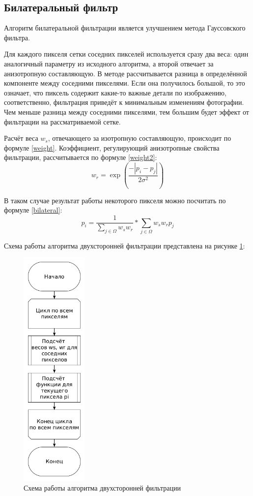 \subsection{Билатеральный фильтр}
Алгоритм билатеральной фильтрации является улучшением метода Гауссовского фильтра.

Для каждого пикселя сетки соседних пикселей используется сразу два веса: один аналогичный параметру из исходного алгоритма, а второй отвечает за анизотропную составляющую. 
В методе рассчитывается разница в определённой компоненте между соседними пикселями.
Если она получилось большой, то это означает, что пиксель содержит какие-то важные детали по изображению, соответственно, фильтрация приведёт к минимальным изменениям фотографии.
Чем меньше разница между соседними пикселями, тем большим будет эффект от фильтрации на рассматриваемой сетке.

Расчёт веса $w_s$, отвечающего за изотропную составляющую, происходит по формуле \ref{weight}. 
Коэффициент, регулирующий анизотропные свойства фильтрации, рассчитывается по формуле \ref{weight2}:
\begin{equation}
	\label{weight2}
	w_{r} = \exp(\frac{-|p_i - p_j|}{2\sigma^2})
\end{equation}

В таком случае результат работы некоторого пикселя можно посчитать по формуле \ref{bilateral}:
\begin{equation}
	\label{bilateral}
	p_i = \frac{1}{\sum_{j \in \Omega}^{} w_{s}w_{r}} * \sum_{j \in \Omega}^{} w_{s}w_{r}p_j 
\end{equation}

Схема работы алгоритма двухсторонней фильтрации представлена на рисунке \ref{fig::bilateral}:
\FloatBarrier
\begin{figure}[h]	
	\begin{center}
		\includegraphics[height=12cm]{inc/png/bilateral.png}
	\end{center}
	\captionsetup{justification=centering}
	\caption{Схема работы алгоритма двухсторонней фильтрации}
	\label{fig::bilateral}
\end{figure}
\FloatBarrier

